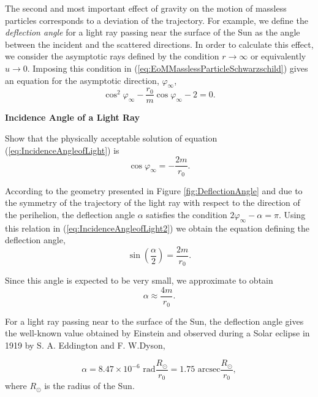 The second and most important effect of gravity on the motion of massless particles corresponds to a deviation of the trajectory.  For example, we define the \textit{deflection angle} for a light ray passing near the surface of the Sun as the angle between the incident and the scattered directions. In order to calculate this effect, we consider the asymptotic rays defined by the condition $r \rightarrow \infty$ or equivalently $u \rightarrow 0$. Imposing this condition in  (\ref{eq:EoMMasslessParticleSchwarzschild}) gives an equation for the asymptotic direction, $\varphi _\infty$,
\begin{equation}
\cos^2 \varphi _\infty - \frac{r_0}{m} \cos \varphi _\infty - 2 = 0. \label{eq:IncidenceAngleofLight}
\end{equation}

\begin{exercise} 
\textbf{Incidence Angle of a Light Ray}

Show that the physically acceptable solution of equation (\ref{eq:IncidenceAngleofLight}) is 
\begin{equation}
\cos \varphi _\infty = -\frac{2m}{r_0}.\label{eq:IncidenceAngleofLight2}
\end{equation}
\end{exercise}

According to the geometry presented in Figure \ref{fig:DeflectionAngle} and due to the symmetry of the trajectory of the light ray with respect to the direction of the perihelion, the deflection angle $\alpha$ satisfies the condition $2\varphi_\infty - \alpha = \pi$. Using this relation in (\ref{eq:IncidenceAngleofLight2}) we obtain the equation defining the deflection angle,
\begin{equation}
\sin \left( \frac{\alpha}{2} \right)= \frac{2m}{r_0}.
\end{equation}

Since this angle is expected to be very small, we approximate to obtain 
\begin{equation}
\alpha \approx \frac{4m}{r_0}.
\end{equation}

For a light ray passing near to the surface of the Sun, the deflection angle gives the well-known value obtained by Einstein and observed during a Solar eclipse in 1919 by S. A. Eddington and F. W.Dyson,
  
\begin{equation}
\alpha = 8.47 \times 10^{-6} \textrm{ rad} \frac{R_{\odot }}{r_0}= 1.75 \textrm{ arcsec} \frac{R_{\odot }}{ r_0},
\end{equation}
where $R_{\odot }$ is the radius of the Sun. 

